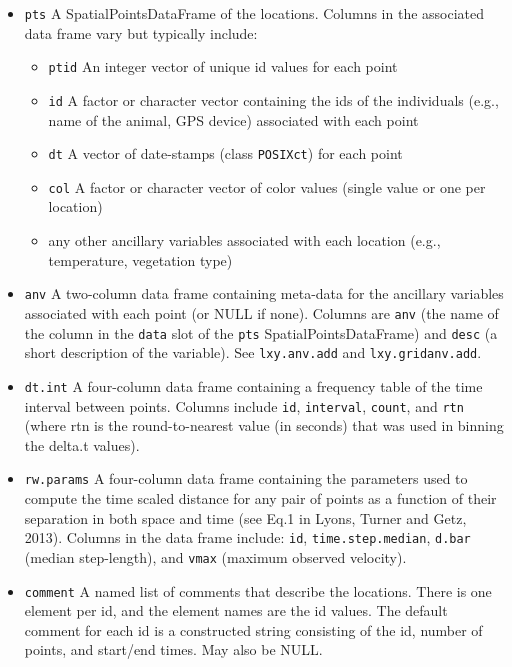 \documentclass{article}
\begin{document}
\begin{itemize}
  \item \texttt{pts} A SpatialPointsDataFrame of the locations. Columns in the associated data frame vary but typically include:

    \begin{itemize}
      \item \texttt{ptid} An integer vector of unique id values for each point
      \item \texttt{id} A factor or character vector containing the ids of the individuals (e.g., name of the animal, GPS device) associated with each point
      \item \texttt{dt} A vector of date-stamps (class \texttt{POSIXct}) for each point
      \item \texttt{col} A factor or character vector of color values (single value or one per location)
      \item any other ancillary variables associated with each location (e.g., temperature, vegetation type)
    \end{itemize}

  \item \texttt{anv} A two-column data frame containing meta-data for the ancillary variables associated with each point (or NULL if none). Columns are \texttt{anv} (the name of the column in the \texttt{data} slot of the \texttt{pts} SpatialPointsDataFrame) and \texttt{desc} (a short description of the variable). See \texttt{lxy.anv.add} and \texttt{lxy.gridanv.add}.

  \item \texttt{dt.int} A four-column data frame containing a frequency table of the time interval between points. Columns include \texttt{id}, \texttt{interval}, \texttt{count}, and \texttt{rtn} (where rtn is the round-to-nearest value (in seconds) that was used in binning the delta.t values).
  
  \item \texttt{rw.params} A four-column data frame containing the parameters used to compute the time scaled distance for any pair of points as a function of their separation in both space and time (see Eq.1 in Lyons, Turner and Getz, 2013). Columns in the data frame include: \texttt{id}, \texttt{time.step.median}, \texttt{d.bar} (median step-length), and \texttt{vmax} (maximum observed velocity). 

  \item \texttt{comment} A named list of comments that describe the locations. There is one element per id, and the element names are the id values. The default comment for each id is a constructed string consisting of the id, number of points, and start/end times. May also be NULL.


\end{itemize}
\end{document}
